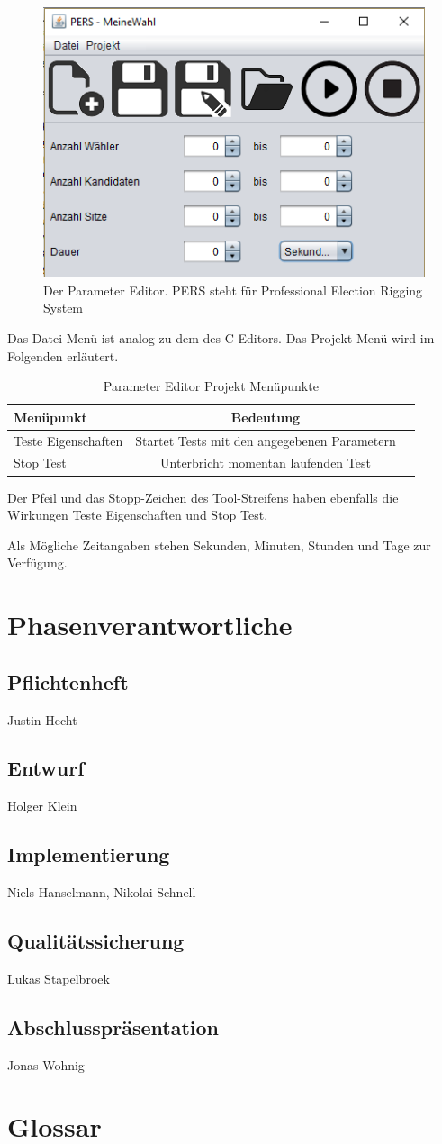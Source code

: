 \documentclass[a4paper]{scrreprt}
\begin{document}
\begin{figure}[H]
\includegraphics[scale=1]{Parameter-editor.png}
\caption{Der Parameter Editor. PERS steht für Professional Election Rigging System}
\label{Parameter-editor}
\end{figure}

Das Datei Menü ist analog zu dem des C Editors. Das Projekt Menü wird im Folgenden erläutert. 

\begin{table}[H]
\begin{tabular}{lcr} 
Menüpunkt & Bedeutung \\
\hline
Teste Eigenschaften & Startet Tests mit den angegebenen Parametern \\
Stop Test & Unterbricht momentan laufenden Test
\end{tabular}
\label{Parameter-Projekt-Menü}
\caption{Parameter Editor Projekt Menüpunkte}
\end{table}

Der Pfeil und das Stopp-Zeichen des Tool-Streifens haben ebenfalls die Wirkungen Teste Eigenschaften und Stop Test. 

Als Mögliche Zeitangaben stehen Sekunden, Minuten, Stunden und Tage zur Verfügung.

\chapter{Phasenverantwortliche}
\section{Pflichtenheft} Justin Hecht
\section{Entwurf} Holger Klein 
\section{Implementierung} Niels Hanselmann, Nikolai Schnell
\section{Qualitätssicherung} Lukas Stapelbroek
\section{Abschlusspräsentation} Jonas Wohnig

\chapter{Glossar}
 

\printglossaries
 

 
\end{document}
